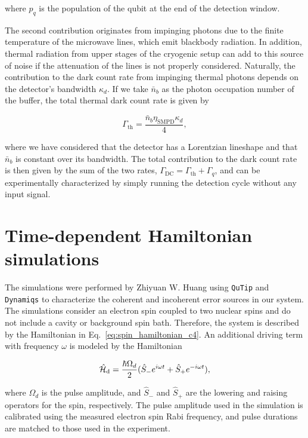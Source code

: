 where $p_q$ is the population of the qubit at the end of the detection window.

The second contribution originates from impinging photons due to the finite temperature of the microwave lines, which emit blackbody radiation. In addition, thermal radiation from upper stages of the cryogenic setup can add to this source of noise if the attenuation of the lines is not properly considered. Naturally, the contribution to the dark count rate from impinging thermal photons depends on the detector's bandwidth  $\kappa_d$. If we take $\bar{n}_b$ as the photon occupation number of the buffer, the total thermal dark count rate is given by

\begin{equation}
    \Gamma_\text{th} = \frac{\bar{n}_b \eta_\text{SMPD} \kappa_d}{4},
\end{equation}

where we have considered that the detector has a Lorentzian lineshape and that $\bar{n}_b$ is constant over its bandwidth. The total contribution to the dark count rate is then given by the sum of the two rates, $\Gamma_\text{DC} = \Gamma_\text{th} + \Gamma_q$, and can be experimentally characterized by simply running the detection cycle without any input signal.


\chapter{Time-dependent Hamiltonian simulations}
\label{app:simulations}

The simulations were performed by Zhiyuan W. Huang using \texttt{QuTip}  and \texttt{Dynamiqs}  to characterize the coherent and incoherent error sources in our system. The simulations consider an electron spin coupled to two nuclear spins and do not include a cavity or background spin bath. Therefore, the system is described by the Hamiltonian in Eq.~\ref{eq:spin_hamiltonian_c4}. An additional driving term with frequency $\omega$ is modeled by the Hamiltonian

\begin{equation}
    \hat{\mathcal{H}}_{\text{d}}= \frac{\hbar\Omega_d}{2}(\hat{S}_{-}e^{i\omega t} + \hat{S}_{+}e^{-i\omega t}),
\end{equation}

where $\Omega_d$ is the pulse amplitude, and $\hat{S}_{-}$ and $\hat{S}_{+}$ are the lowering and raising operators for the \Er spin, respectively. The pulse amplitude used in the simulation is calibrated using the measured electron spin Rabi frequency, and pulse durations are matched to those used in the experiment.

